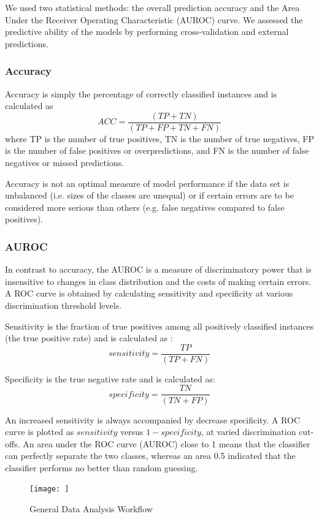 We used two statistical methods: the overall prediction accuracy and the Area Under the Receiver Operating Characteristic (AUROC) curve. We assessed the predictive ability of the models by performing cross-validation and external predictions.

\subsubsection{Accuracy}

Accuracy is simply the percentage of correctly classified instances and is calculated as
$$ ACC =\frac{(TP + TN)}{(TP + FP + TN + FN)} $$
where TP is the number of true positives, TN is the number of true negatives, FP is the number of false positives or over­predictions, and FN is the number of false negatives or missed predictions.\cite{Lapins2013}

Accuracy is not an optimal measure of model performance if the data set is unbalanced (i.e. sizes of the classes are unequal) or if certain errors are to be considered more serious than others (e.g. false negatives compared to false positives).\cite{Lapins2013}

\subsubsection{AUROC}
In contrast to accuracy, the AUROC is a measure of discriminatory power that is insensitive to changes in class distribution and the costs of making certain errors. A ROC curve is obtained by calculating sensitivity and specificity at various discrimination threshold levels.

Sensitivity is the fraction of true positives among all positively classified instances (the true positive rate) and is calculated as : 
$$ sensitivity = \frac{TP}{(TP + FN)} $$

Specificity is the true negative rate and is calculated as:
$$ specificity =\frac{ TN }{(TN + FP)} $$

An increased sensitivity is always accompanied by decrease specificity. A ROC curve is plotted as $sensitivity$ versus $1-specificity$, at varied discrimination cut-offs. An area under the ROC curve (AUROC) close to 1 means that the classifier can perfectly separate the two classes, whereas an area 0.5 indicated that the classifier performs no better than random guessing.\cite{Lapins2013}


\begin{figure}[h,t]
  \caption{General Data Analysis Workflow}
  \centering
   \texttt{[image: ]}
\end{figure}

